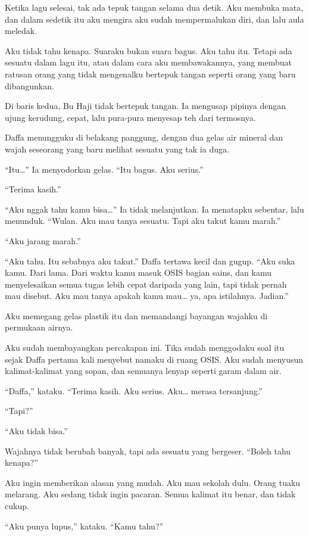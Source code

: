 \documentclass[11pt,twoside,openany]{book}
\makeatletter
\newcommand{\scenebreak}{\par\vspace{0.9em}{\centering\textsc{*\hspace{0.7em}*\hspace{0.7em}*}\par}\vspace{0.9em}\@afterindentfalse\@afterheading}
\makeatother
\begin{document}
Ketika lagu selesai, tak ada tepuk tangan selama dua detik. Aku membuka mata, dan dalam sedetik itu aku mengira aku sudah mempermalukan diri, dan lalu aula meledak.

Aku tidak tahu kenapa. Suaraku bukan suara bagus. Aku tahu itu. Tetapi ada sesuatu dalam lagu itu, atau dalam cara aku membawakannya, yang membuat ratusan orang yang tidak mengenalku bertepuk tangan seperti orang yang baru dibangunkan.

Di baris kedua, Bu Haji tidak bertepuk tangan. Ia mengusap pipinya dengan ujung kerudung, cepat, lalu pura-pura menyesap teh dari termosnya.

\scenebreak
Daffa menungguku di belakang panggung, dengan dua gelas air mineral dan wajah seseorang yang baru melihat sesuatu yang tak ia duga.

``Itu\ldots{}'' Ia menyodorkan gelas. ``Itu bagus. Aku serius.''

``Terima kasih.''

``Aku nggak tahu kamu bisa\ldots{}'' Ia tidak melanjutkan. Ia menatapku sebentar, lalu menunduk. ``Wulan. Aku mau tanya sesuatu. Tapi aku takut kamu marah.''

``Aku jarang marah.''

``Aku tahu. Itu sebabnya aku takut.'' Daffa tertawa kecil dan gugup. ``Aku suka kamu. Dari lama. Dari waktu kamu masuk OSIS bagian sains, dan kamu menyelesaikan semua tugas lebih cepat daripada yang lain, tapi tidak pernah mau disebut. Aku mau tanya apakah kamu mau\ldots{} ya, apa istilahnya. Jadian.''

Aku memegang gelas plastik itu dan memandangi bayangan wajahku di permukaan airnya.

Aku sudah membayangkan percakapan ini. Tika sudah menggodaku soal itu sejak Daffa pertama kali menyebut namaku di ruang OSIS. Aku sudah menyusun kalimat-kalimat yang sopan, dan semuanya lenyap seperti garam dalam air.

``Daffa,'' kataku. ``Terima kasih. Aku serius. Aku\ldots{} merasa tersanjung.''

``Tapi?''

``Aku tidak bisa.''

Wajahnya tidak berubah banyak, tapi ada sesuatu yang bergeser. ``Boleh tahu kenapa?''

Aku ingin memberikan alasan yang mudah. Aku mau sekolah dulu. Orang tuaku melarang. Aku sedang tidak ingin pacaran. Semua kalimat itu benar, dan tidak cukup.

``Aku punya lupus,'' kataku. ``Kamu tahu?''
\end{document}
